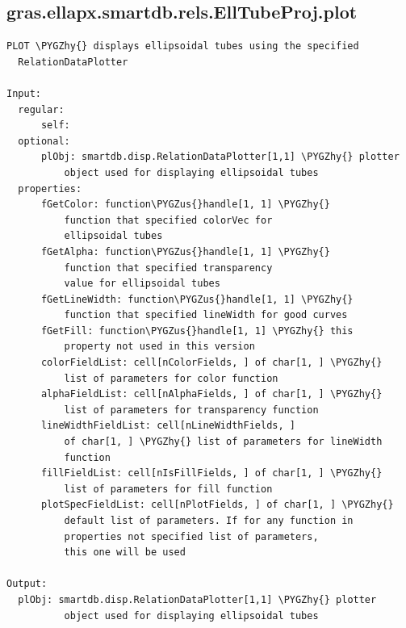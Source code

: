 \documentclass[letterpaper,10pt,english]{sphinxmanual}
\def\PYGZus{\char`\_}
\def\PYGZhy{\char`\-}
\begin{document}
\subsection{gras.ellapx.smartdb.rels.EllTubeProj.plot}
\label{chap_functions:gras-ellapx-smartdb-rels-elltubeproj-plot}
\begin{Verbatim}[commandchars=\\\{\}]
PLOT \PYGZhy{} displays ellipsoidal tubes using the specified
  RelationDataPlotter

Input:
  regular:
      self:
  optional:
      plObj: smartdb.disp.RelationDataPlotter[1,1] \PYGZhy{} plotter
          object used for displaying ellipsoidal tubes
  properties:
      fGetColor: function\PYGZus{}handle[1, 1] \PYGZhy{}
          function that specified colorVec for
          ellipsoidal tubes
      fGetAlpha: function\PYGZus{}handle[1, 1] \PYGZhy{}
          function that specified transparency
          value for ellipsoidal tubes
      fGetLineWidth: function\PYGZus{}handle[1, 1] \PYGZhy{}
          function that specified lineWidth for good curves
      fGetFill: function\PYGZus{}handle[1, 1] \PYGZhy{} this
          property not used in this version
      colorFieldList: cell[nColorFields, ] of char[1, ] \PYGZhy{}
          list of parameters for color function
      alphaFieldList: cell[nAlphaFields, ] of char[1, ] \PYGZhy{}
          list of parameters for transparency function
      lineWidthFieldList: cell[nLineWidthFields, ]
          of char[1, ] \PYGZhy{} list of parameters for lineWidth
          function
      fillFieldList: cell[nIsFillFields, ] of char[1, ] \PYGZhy{}
          list of parameters for fill function
      plotSpecFieldList: cell[nPlotFields, ] of char[1, ] \PYGZhy{}
          default list of parameters. If for any function in
          properties not specified list of parameters,
          this one will be used

Output:
  plObj: smartdb.disp.RelationDataPlotter[1,1] \PYGZhy{} plotter
          object used for displaying ellipsoidal tubes
\end{Verbatim}
\end{document}
